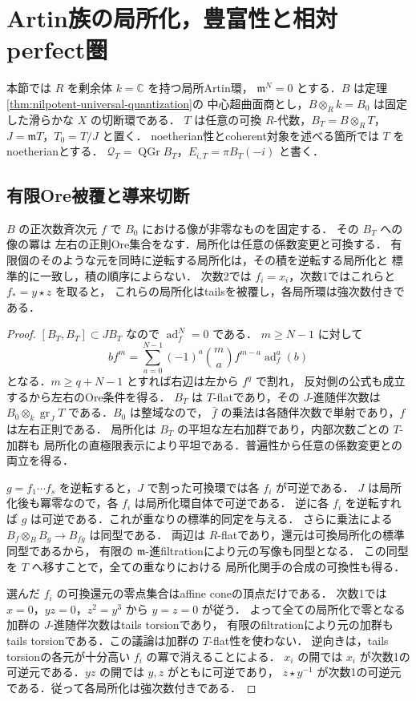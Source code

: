 \section{Artin族の局所化，豊富性と相対perfect圏}
\label{sec:artin-ample-perfect}

本節では $R$ を剰余体 $k=\mathbb C$ を持つ局所Artin環，
$\mathfrak m^N=0$ とする．$B$ は定理\ref{thm:nilpotent-universal-quantization}の
中心超曲面商とし，$B\otimes_R k=B_0$ は固定した滑らかな $X$ の切断環である．
$T$ は任意の可換 $R$-代数，$B_T=B\otimes_RT$，
$J=\mathfrak mT$，$T_0=T/J$ と置く．
noetherian性とcoherent対象を述べる箇所では $T$ をnoetherianとする．
$\mathcal Q_T=\operatorname{QGr}B_T$，$E_{i,T}=\pi B_T(-i)$ と書く．

\subsection{有限Ore被覆と導来切断}
\begin{lemma}[斉次Ore局所化と重なり]
\label{lem:artin-ore-cover}
$B$ の正次数斉次元 $f$ で $B_0$ における像が非零なものを固定する．
その $B_T$ への像の冪は
左右の正則Ore集合をなす．局所化は任意の係数変更と可換する．
有限個のそのような元を同時に逆転する局所化は，その積を逆転する局所化と
標準的に一致し，積の順序によらない．
次数2では $f_i=x_i$，次数1ではこれらと $f_*=y\star z$ を取ると，
これらの局所化はtailsを被覆し，各局所環は強次数付きである．
\end{lemma}
\begin{proof}
$[B_T,B_T]\subset JB_T$ なので $\operatorname{ad}_f^N=0$ である．
$m\ge N-1$ に対して
\[
 b f^m=\sum_{a=0}^{N-1}(-1)^a\binom ma f^{m-a}\operatorname{ad}_f^a(b)
\]
となる．$m\ge q+N-1$ とすれば右辺は左から $f^q$ で割れ，
反対側の公式も成立するから左右のOre条件を得る．
$B_T$ は $T$-flatであり，その $J$-進随伴次数は
$B_0\otimes_k\operatorname{gr}_J T$ である．$B_0$ は整域なので，
$\bar f$ の乗法は各随伴次数で単射であり，$f$ は左右正則である．
局所化は $B_T$ の平坦な左右加群であり，内部次数ごとの $T$-加群も
局所化の直極限表示により平坦である．普遍性から任意の係数変更との両立を得る．

$g=f_1\cdots f_s$ を逆転すると，$J$ で割った可換環では各 $f_i$ が可逆である．
$J$ は局所化後も冪零なので，各 $f_i$ は局所化環自体で可逆である．
逆に各 $f_i$ を逆転すれば $g$ は可逆である．これが重なりの標準的同定を与える．
さらに乗法による $B_f\otimes_B B_g\to B_{fg}$ は同型である．
両辺は $R$-flatであり，還元は可換局所化の標準同型であるから，
有限の $\mathfrak m$-進filtrationにより元の写像も同型となる．
この同型を $T$ へ移すことで，全ての重なりにおける
局所化関手の合成の可換性も得る．

選んだ $f_i$ の可換還元の零点集合はaffine coneの頂点だけである．
次数1では $x=0$，$yz=0$，$z^2=y^3$ から $y=z=0$ が従う．
よって全ての局所化で零となる加群の $J$-進随伴次数はtails torsionであり，
有限のfiltrationにより元の加群もtails torsionである．この議論は加群の $T$-flat性を使わない．
逆向きは，tails torsionの各元が十分高い $f_i$ の冪で消えることによる．
$x_i$ の開では $x_i$ が次数1の可逆元である．$yz$ の開では $y,z$ がともに可逆であり，
$z\star y^{-1}$ が次数1の可逆元である．従って各局所化は強次数付きである．
\end{proof}

